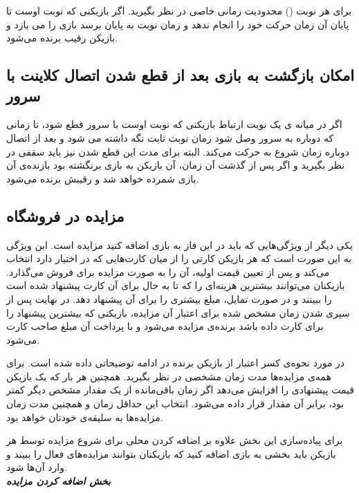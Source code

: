 \documentclass[]{article}
\begin{document}
برای هر نوبت () محدودیت زمانی خاصی در نظر بگیرید. اگر بازیکنی که نوبت اوست تا پایان آن زمان حرکت خود را انجام ندهد و زمان نوبت به پایان برسد بازی را می بازد و بازیکن رقیب برنده می‌شود.

\subsection*{{\titr امکان بازگشت به بازی بعد از قطع شدن اتصال کلاینت با سرور}}

اگر در میانه ی یک نوبت ارتباط بازیکنی که نوبت اوست با سرور قطع شود، تا زمانی که دوباره به سرور وصل شود زمان نوبت ثابت نگه داشته می شود و بعد از اتصال دوباره زمان شروع به حرکت می‌کند. البته برای مدت این قطع شدن نیز باید سقفی در نظر بگیرید و اگر پس از گذشت آن زمان، آن بازیکن به بازی برنگشته بود بازنده‌ی آن بازی شمرده خواهد شد و رقیبش برنده می‌شود.

\subsection*{{\titr مزایده در فروشگاه}}

یکی دیگر از ویژگی‌هایی که باید در این فاز به بازی اضافه کنید مزایده است. این ویژگی به این صورت است که هر بازیکن کارتی را از میان کارت‌هایی که در اختیار دارد انتخاب می‌کند و پس از تعیین قیمت اولیه، آن را به صورت مزایده برای فروش می‌گذارد. بازیکنان می‌توانند بیشترین هزینه‌ای را که تا به حال برای آن کارت پیشنهاد شده است را ببینند و در صورت تمایل، مبلغ بیشتری را برای آن پیشنهاد دهد. در نهایت پس از سپری شدن زمان مشخص شده برای اعتبار آن مزایده، بازیکنی که بیشترین پیشنهاد را برای کارت داده باشد برنده‌ی مزایده می‌شود و با پرداخت آن مبلغ صاحب کارت می‌شود. 

در مورد نحوه‌ی کسر اعتبار از بازیکن برنده در ادامه توضیحاتی ‌داده شده است. برای همه‌ی مزایده‌ها مدت زمان مشخصی در نظر بگیرید. همچنین هر بار که یک بازیکن قیمت پیشنهادی را افزایش می‌دهد اگر زمان باقی‌مانده از یک مقدار مشخص دیگر کمتر بود، برابر آن مقدار قرار داده می‌شود. انتخاب این حداقل زمان و همچنین مدت زمان مزایده‌ها به سلیقه‌ی خودتان خواهد بود.

برای پیاده‌سازی این بخش علاوه بر اضافه کردن محلی برای شروع مزایده توسط هر بازیکن باید بخشی به بازی اضافه کنید که بازیکنان بتوانند مزایده‌های فعال را ببیند و وارد آن‌ها شود.
\\

\textbf{\emph{ بخش اضافه کردن مزایده }}
\end{document}
